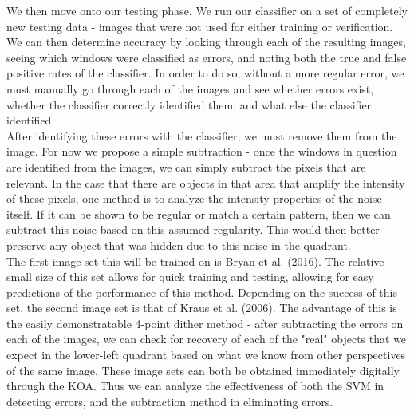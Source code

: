 \documentclass[12pt]{article}
\begin{document}
\indent We then move onto our testing phase. We run our classifier on a set of completely new testing data - images that were not used for either training or verification. We can then determine accuracy by looking through each of the resulting images, seeing which windows were classified as errors, and noting both the true and false positive rates of the classifier. In order to do so, without a more regular error, we must manually go through each of the images and see whether errors exist, whether the classifier correctly identified them, and what else the classifier identified.\\
\indent After identifying these errors with the classifier, we must remove them from the image. For now we propose a simple subtraction - once the windows in question are identified from the images, we can simply subtract the pixels that are relevant. In the case that there are objects in that area that amplify the intensity of these pixels, one method is to analyze the intensity properties of the noise itself. If it can be shown to be regular or match a certain pattern, then we can subtract this noise based on this assumed regularity. This would then better preserve any object that was hidden due to this noise in the quadrant.\\
\indent The first image set this will be trained on is Bryan et al. (2016). The relative small size of this set allows for quick training and testing, allowing for easy predictions of the performance of this method. Depending on the success of this set, the second image set is that of Kraus et al. (2006). The advantage of this is the easily demonstratable 4-point dither method - after subtracting the errors on each of the images, we can check for recovery of each of the "real" objects that we expect in the lower-left quadrant based on what we know from other perspectives of the same image. These image sets can both be obtained immediately digitally through the KOA. Thus we can analyze the effectiveness of both the SVM in detecting errors, and the subtraction method in eliminating errors.


\newpage
\end{document}
